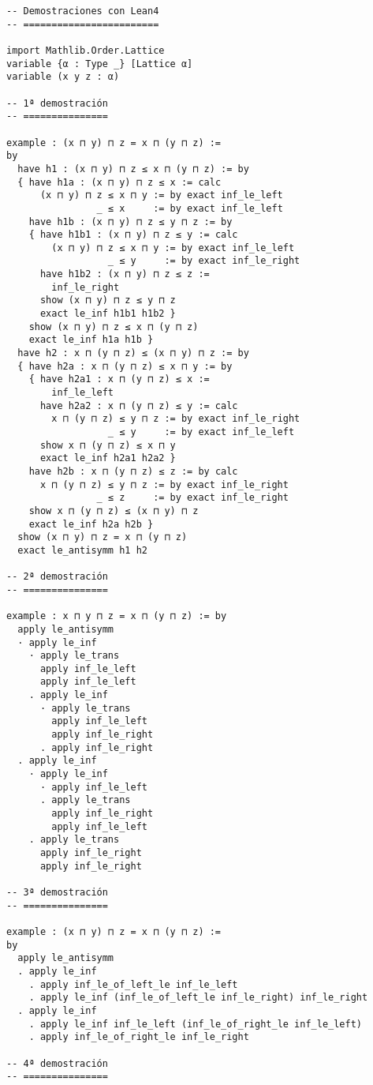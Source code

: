\begin{verbatim}
-- Demostraciones con Lean4
-- ========================

import Mathlib.Order.Lattice
variable {α : Type _} [Lattice α]
variable (x y z : α)

-- 1ª demostración
-- ===============

example : (x ⊓ y) ⊓ z = x ⊓ (y ⊓ z) :=
by
  have h1 : (x ⊓ y) ⊓ z ≤ x ⊓ (y ⊓ z) := by
  { have h1a : (x ⊓ y) ⊓ z ≤ x := calc
      (x ⊓ y) ⊓ z ≤ x ⊓ y := by exact inf_le_left
                _ ≤ x     := by exact inf_le_left
    have h1b : (x ⊓ y) ⊓ z ≤ y ⊓ z := by
    { have h1b1 : (x ⊓ y) ⊓ z ≤ y := calc
        (x ⊓ y) ⊓ z ≤ x ⊓ y := by exact inf_le_left
                  _ ≤ y     := by exact inf_le_right
      have h1b2 : (x ⊓ y) ⊓ z ≤ z :=
        inf_le_right
      show (x ⊓ y) ⊓ z ≤ y ⊓ z
      exact le_inf h1b1 h1b2 }
    show (x ⊓ y) ⊓ z ≤ x ⊓ (y ⊓ z)
    exact le_inf h1a h1b }
  have h2 : x ⊓ (y ⊓ z) ≤ (x ⊓ y) ⊓ z := by
  { have h2a : x ⊓ (y ⊓ z) ≤ x ⊓ y := by
    { have h2a1 : x ⊓ (y ⊓ z) ≤ x :=
        inf_le_left
      have h2a2 : x ⊓ (y ⊓ z) ≤ y := calc
        x ⊓ (y ⊓ z) ≤ y ⊓ z := by exact inf_le_right
                  _ ≤ y     := by exact inf_le_left
      show x ⊓ (y ⊓ z) ≤ x ⊓ y
      exact le_inf h2a1 h2a2 }
    have h2b : x ⊓ (y ⊓ z) ≤ z := by calc
      x ⊓ (y ⊓ z) ≤ y ⊓ z := by exact inf_le_right
                _ ≤ z     := by exact inf_le_right
    show x ⊓ (y ⊓ z) ≤ (x ⊓ y) ⊓ z
    exact le_inf h2a h2b }
  show (x ⊓ y) ⊓ z = x ⊓ (y ⊓ z)
  exact le_antisymm h1 h2

-- 2ª demostración
-- ===============

example : x ⊓ y ⊓ z = x ⊓ (y ⊓ z) := by
  apply le_antisymm
  · apply le_inf
    · apply le_trans
      apply inf_le_left
      apply inf_le_left
    . apply le_inf
      · apply le_trans
        apply inf_le_left
        apply inf_le_right
      . apply inf_le_right
  . apply le_inf
    · apply le_inf
      · apply inf_le_left
      . apply le_trans
        apply inf_le_right
        apply inf_le_left
    . apply le_trans
      apply inf_le_right
      apply inf_le_right

-- 3ª demostración
-- ===============

example : (x ⊓ y) ⊓ z = x ⊓ (y ⊓ z) :=
by
  apply le_antisymm
  . apply le_inf
    . apply inf_le_of_left_le inf_le_left
    . apply le_inf (inf_le_of_left_le inf_le_right) inf_le_right
  . apply le_inf
    . apply le_inf inf_le_left (inf_le_of_right_le inf_le_left)
    . apply inf_le_of_right_le inf_le_right

-- 4ª demostración
-- ===============


\end{verbatim}
